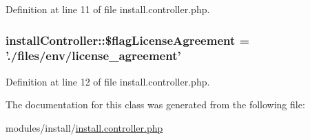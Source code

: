 Definition at line 11 of file install.\-controller.\-php.

\hypertarget{classinstallController_af1f7a5fe91be6a576cdffcc07cba5be8}{
\subsubsection[{\$flag\-License\-Agreement}]{\setlength{\rightskip}{0pt plus 5cm}install\-Controller\-::\$flag\-License\-Agreement = './files/env/license\-\_\-agreement'}}\label{classinstallController_af1f7a5fe91be6a576cdffcc07cba5be8}


Definition at line 12 of file install.\-controller.\-php.



The documentation for this class was generated from the following file\-:\begin{DoxyCompactItemize}
\item 
modules/install/\hyperlink{install_8controller_8php}{install.\-controller.\-php}\end{DoxyCompactItemize}
